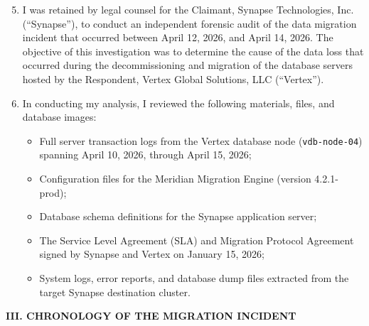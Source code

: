 \documentclass[12pt,letterpaper]{article}
\begin{document}
\begin{enumerate}[label=\arabic*., leftmargin=0.4in, rightmargin=0.1in, align=left]
  \setcounter{enumi}{4}
  \item I was retained by legal counsel for the Claimant, Synapse Technologies, Inc. (``Synapse''), to conduct an independent forensic audit of the data migration incident that occurred between April 12, 2026, and April 14, 2026. The objective of this investigation was to determine the cause of the data loss that occurred during the decommissioning and migration of the database servers hosted by the Respondent, Vertex Global Solutions, LLC (``Vertex'').
  
  \item In conducting my analysis, I reviewed the following materials, files, and database images:
  \begin{itemize}[leftmargin=0.3in]
    \item Full server transaction logs from the Vertex database node (\texttt{vdb-node-04}) spanning April 10, 2026, through April 15, 2026;
    \item Configuration files for the Meridian Migration Engine (version 4.2.1-prod);
    \item Database schema definitions for the Synapse application server;
    \item The Service Level Agreement (SLA) and Migration Protocol Agreement signed by Synapse and Vertex on January 15, 2026;
    \item System logs, error reports, and database dump files extracted from the target Synapse destination cluster.
  \end{itemize}
\end{enumerate}

\par\vspace{1.0em}

\begin{center}
  \textbf{\textcolor{LegalNavy}{\MakeUppercase{III. Chronology of the Migration Incident}}}
\end{center}
\par\vspace{0.3em}
\end{document}
